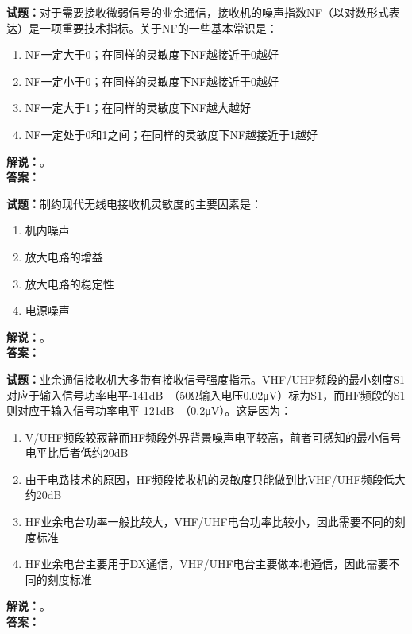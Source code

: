 \documentclass{ctexbook}
\begin{document}
\noindent\textbf{试题：}对于需要接收微弱信号的业余通信，接收机的噪声指数NF（以对数形式表达）是一项重要技术指标。关于NF的一些基本常识是：
\begin{enumerate}[leftmargin=3em]
  \item NF一定大于0；在同样的灵敏度下NF越接近于0越好
  \item NF一定小于0；在同样的灵敏度下NF越接近于0越好
  \item NF一定大于1；在同样的灵敏度下NF越大越好
  \item NF一定处于0和1之间；在同样的灵敏度下NF越接近于1越好
\end{enumerate}
\noindent\textbf{解说：}\textbf{}。\\\noindent\textbf{答案：}

\bigskip

\noindent\textbf{试题：}制约现代无线电接收机灵敏度的主要因素是：
\begin{enumerate}[leftmargin=3em]
  \item 机内噪声
  \item 放大电路的增益
  \item 放大电路的稳定性
  \item 电源噪声
\end{enumerate}
\noindent\textbf{解说：}\textbf{}。\\\noindent\textbf{答案：}

\bigskip

\noindent\textbf{试题：}业余通信接收机大多带有接收信号强度指示。VHF/UHF频段的最小刻度S1对应于输入信号功率电平-141\unit[qualifier-mode=combine]{\deci\bel{}}（50Ω输入电压0.02μV）标为S1，而HF频段的S1则对应于输入信号功率电平-121\unit[qualifier-mode=combine]{\deci\bel{}}（0.2μV）。这是因为：
\begin{enumerate}[leftmargin=3em]
  \item V/UHF频段较寂静而HF频段外界背景噪声电平较高，前者可感知的最小信号电平比后者低约20dB
  \item 由于电路技术的原因，HF频段接收机的灵敏度只能做到比VHF/UHF频段低大约20dB
  \item HF业余电台功率一般比较大，VHF/UHF电台功率比较小，因此需要不同的刻度标准
  \item HF业余电台主要用于DX通信，VHF/UHF电台主要做本地通信，因此需要不同的刻度标准
\end{enumerate}
\noindent\textbf{解说：}\textbf{}。\\\noindent\textbf{答案：}

\bigskip
\end{document}
